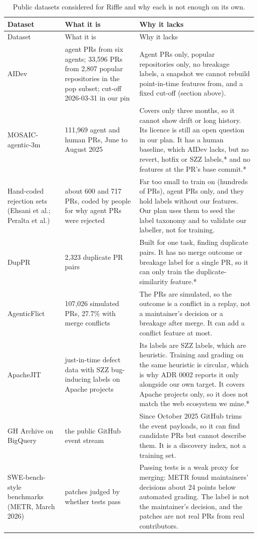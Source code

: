 \documentclass[11pt,a4paper]{article}
\begin{document}
\begin{center}
\small
\begin{longtable}{@{}p{2.9cm}p{4.4cm}p{7.3cm}@{}}
\caption{Public datasets considered for Riffle and why each is not enough on its own.}\label{tab:datasets}\\
\toprule
Dataset & What it is & Why it lacks \\
\midrule
\endfirsthead
\toprule
Dataset & What it is & Why it lacks \\
\midrule
\endhead
AIDev & agent PRs from six agents; 33,596 PRs from 2,807 popular repositories in the pop subset; cut-off 2026-03-31 in our pin & Agent PRs only, popular repositories only, no breakage labels, a snapshot we cannot rebuild point-in-time features from, and a fixed cut-off (section above). \\
MOSAIC-agentic-3m & 111,969 agent and human PRs, June to August 2025 & Covers only three months, so it cannot show drift or long history. Its licence is still an open question in our plan. It has a human baseline, which AIDev lacks, but no revert, hotfix or SZZ labels,* and no features at the PR's base commit.* \\
Hand-coded rejection sets (Ehsani et al.; Peralta et al.) & about 600 and 717 PRs, coded by people for why agent PRs were rejected & Far too small to train on (hundreds of PRs), agent PRs only, and they hold labels without our features. Our plan uses them to seed the label taxonomy and to validate our labeller, not for training. \\
DupPR & 2,323 duplicate PR pairs & Built for one task, finding duplicate pairs. It has no merge outcome or breakage label for a single PR, so it can only train the duplicate-similarity feature.* \\
AgenticFlict & 107,026 simulated PRs, 27.7\% with merge conflicts & The PRs are simulated, so the outcome is a conflict in a replay, not a maintainer's decision or a breakage after merge. It can add a conflict feature at most. \\
ApacheJIT & just-in-time defect data with SZZ bug-inducing labels on Apache projects & Its labels are SZZ labels, which are heuristic. Training and grading on the same heuristic is circular, which is why ADR 0002 reports it only alongside our own target. It covers Apache projects only, so it does not match the web ecosystem we mine.* \\
GH Archive on BigQuery & the public GitHub event stream & Since October 2025 GitHub trims the event payloads, so it can find candidate PRs but cannot describe them. It is a discovery index, not a training set. \\
SWE-bench-style benchmarks (METR, March 2026) & patches judged by whether tests pass & Passing tests is a weak proxy for merging: METR found maintainers' decisions about 24 points below automated grading. The label is not the maintainer's decision, and the patches are not real PRs from real contributors. \\
\bottomrule
\end{longtable}
\end{center}
\end{document}
